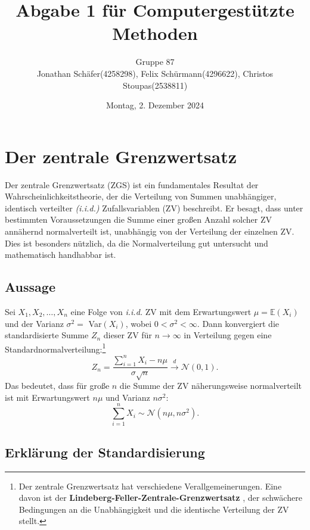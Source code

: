 \documentclass{article}
\title{Abgabe 1 für Computergestützte Methoden}
\author{Gruppe 87\\Jonathan Schäfer(4258298), Felix Schürmann(4296622), Christos Stoupas(2538811) }
\date{Montag, 2. Dezember 2024}
\begin{document}
\maketitle

\tableofcontents

\newpage

\section{Der zentrale Grenzwertsatz}

Der zentrale Grenzwertsatz (ZGS) ist ein fundamentales Resultat der Wahrscheinlichkeitstheorie, der die Verteilung von Summen unabhängiger, identisch verteilter \textit{(i.i.d.)}  Zufallsvariablen (ZV) beschreibt. Er besagt, dass unter bestimmten Voraussetzungen die Summe einer großen Anzahl solcher ZV annähernd normalverteilt ist, unabhängig von der Verteilung der einzelnen ZV. Dies ist besonders nützlich, da die Normalverteilung gut untersucht und mathematisch handhabbar ist.

\subsection{Aussage}

Sei $X_{1}, X_{2}, \ldots ,X_{n}$ eine Folge von \textit{i.i.d.} ZV mit dem Erwartungswert $\mu = \mathbb{E}(X_{i})$ und der Varianz $\sigma^2 =$ Var$(X_{i})$, wobei $0 < \sigma^2 < \infty$. Dann konvergiert die standardisierte Summe $Z_{n}$ dieser ZV für $n \to \infty$ in Verteilung gegen eine Standardnormalverteilung:\footnote{Der zentrale Grenzwertsatz hat verschiedene Verallgemeinerungen. Eine davon ist der
\textbf{Lindeberg-Feller-Zentrale-Grenzwertsatz }\cite[Seite 328]{Wtheorie}, der schwächere Bedingungen an die Unabhängigkeit und die identische Verteilung der ZV stellt.} 
\begin{equation}
    \label{standardsumme}
    Z_n = \frac{\sum_{i=1}^{n} X_{i}-n\mu}{\sigma\sqrt{n}} \xrightarrow{d} \mathcal{N}(0,1).
\end{equation}
Das bedeutet, dass für große $n$ die Summe der ZV näherungsweise normalverteilt ist mit Erwartungswert $n\mu$ und Varianz $n\sigma^2$:
\begin{equation}
    \label{normalverteilteZV}
    \sum_{i=1}^{n} X_{i} \sim \mathcal{N}(n\mu,n\sigma^2).
\end{equation}

\subsection{Erklärung der Standardisierung}
\end{document}
